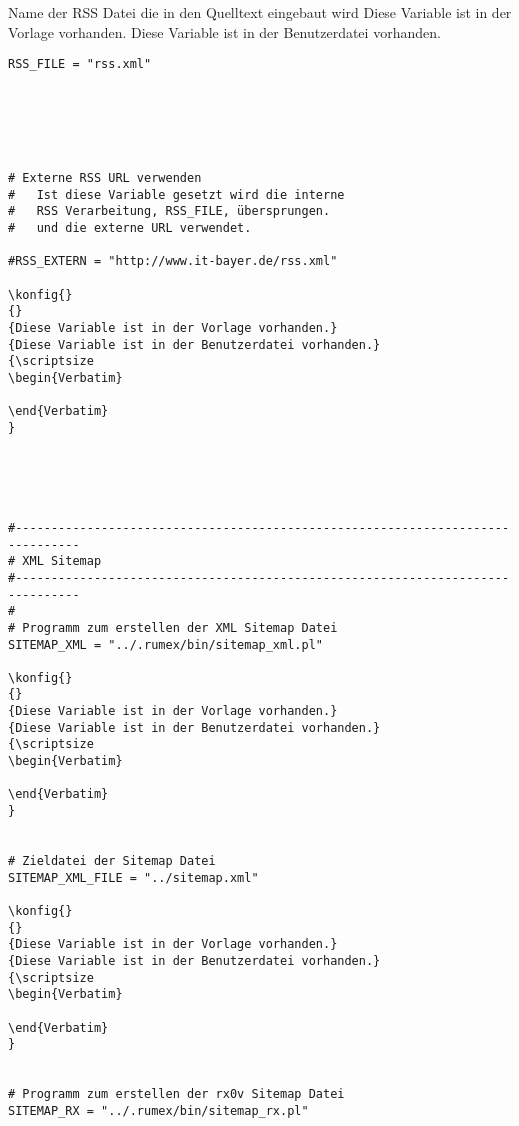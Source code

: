 {Name der RSS Datei die in den Quelltext eingebaut wird}
{Diese Variable ist in der Vorlage vorhanden.}
{Diese Variable ist in der Benutzerdatei vorhanden.}
{\scriptsize
\begin{Verbatim}
RSS_FILE = "rss.xml"
\end{Verbatim}
}









\begin{verbatim}





# Externe RSS URL verwenden
# 	Ist diese Variable gesetzt wird die interne
# 	RSS Verarbeitung, RSS_FILE, übersprungen.
# 	und die externe URL verwendet.

#RSS_EXTERN = "http://www.it-bayer.de/rss.xml"

\konfig{}
{}
{Diese Variable ist in der Vorlage vorhanden.}
{Diese Variable ist in der Benutzerdatei vorhanden.}
{\scriptsize
\begin{Verbatim}

\end{Verbatim}
}





#-------------------------------------------------------------------------------
# XML Sitemap
#-------------------------------------------------------------------------------
#
# Programm zum erstellen der XML Sitemap Datei
SITEMAP_XML = "../.rumex/bin/sitemap_xml.pl"

\konfig{}
{}
{Diese Variable ist in der Vorlage vorhanden.}
{Diese Variable ist in der Benutzerdatei vorhanden.}
{\scriptsize
\begin{Verbatim}

\end{Verbatim}
}


# Zieldatei der Sitemap Datei
SITEMAP_XML_FILE = "../sitemap.xml"

\konfig{}
{}
{Diese Variable ist in der Vorlage vorhanden.}
{Diese Variable ist in der Benutzerdatei vorhanden.}
{\scriptsize
\begin{Verbatim}

\end{Verbatim}
}


# Programm zum erstellen der rx0v Sitemap Datei
SITEMAP_RX = "../.rumex/bin/sitemap_rx.pl"


\end{verbatim}
